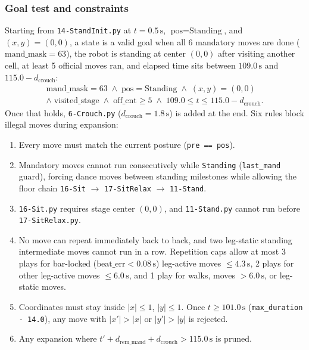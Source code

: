 \documentclass[11pt,a4paper]{article}
\newcommand{\code}[1]{\texttt{#1}}
\begin{document}
\subsubsection{Goal test and constraints}
Starting from \code{14-StandInit.py} at $t=0.5\,\text{s}$, $\text{pos}=\text{Standing}$, and $(x,y)=(0,0)$, a state is a valid goal when all 6 mandatory moves are done ($\text{mand\_mask}=63$), the robot is standing at center $(0,0)$ after visiting another cell, at least 5 official moves ran, and elapsed time sits between $109.0\,\text{s}$ and $115.0 - d_{\text{crouch}}$:
\begin{align*}
  \text{mand\_mask} = 63 \;\wedge\; \text{pos} = \text{Standing} \;\wedge\; (x, y) = (0, 0) \\
  \wedge\; \text{visited\_stage} \;\wedge\; \text{off\_cnt} \ge 5 \;\wedge\; 109.0 \le t \le 115.0 - d_{\text{crouch}}.
\end{align*}
Once that holds, \code{6-Crouch.py} ($d_{\text{crouch}}=1.8\,\text{s}$) is added at the end. Six rules block illegal moves during expansion:
\begin{enumerate}[leftmargin=1.5em]
  \item Every move must match the current posture (\code{pre == pos}).
  \item Mandatory moves cannot run consecutively while \code{Standing} (\code{last\_mand} guard), forcing dance moves between standing milestones while allowing the floor chain \code{16-Sit} $\to$ \code{17-SitRelax} $\to$ \code{11-Stand}.
  \item \code{16-Sit.py} requires stage center $(0,0)$, and \code{11-Stand.py} cannot run before \code{17-SitRelax.py}.
  \item No move can repeat immediately back to back, and two leg-static standing intermediate moves cannot run in a row. Repetition caps allow at most 3 plays for bar-locked ($\text{beat\_err} < 0.08\,\text{s}$) leg-active moves $\le 4.3\,\text{s}$, 2 plays for other leg-active moves $\le 6.0\,\text{s}$, and 1 play for walks, moves $>6.0\,\text{s}$, or leg-static moves.
  \item Coordinates must stay inside $|x| \le 1$, $|y| \le 1$. Once $t \ge 101.0\,\text{s}$ (\code{max\_duration - 14.0}), any move with $|x'| > |x|$ or $|y'| > |y|$ is rejected.
  \item Any expansion where $t' + d_{\text{rem\_mand}} + d_{\text{crouch}} > 115.0\,\text{s}$ is pruned.
\end{enumerate}
\end{document}
